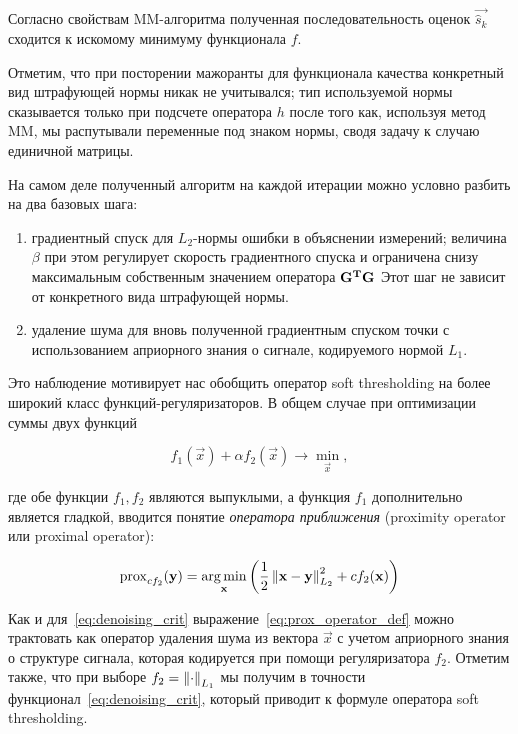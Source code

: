 Согласно свойствам MM-алгоритма полученная последовательность оценок
$\vec{\hat{s}_k}$ сходится к искомому минимуму функционала $f$.

Отметим, что при посторении мажоранты для функционала качества конкретный вид
штрафующей нормы никак не учитывался; тип используемой нормы сказывается только
при подсчете оператора $h$ после того как, используя метод MM, мы распутывали
переменные под знаком нормы, сводя задачу к случаю единичной матрицы.

На самом деле полученный алгоритм на каждой итерации можно условно разбить на два базовых
шага: 

\begin{enumerate}
    \item градиентный спуск для $L_2$-нормы ошибки в объяснении измерений;
        величина $\beta$ при этом регулирует скорость градиентного спуска и ограничена
        снизу максимальным собственным значением оператора $\mathbf{G^TG}$
        Этот шаг не зависит от конкретного вида штрафующей нормы.
    \item удаление шума для вновь полученной градиентным спуском точки с
        использованием априорного знания о сигнале, кодируемого нормой $L_1$.
\end{enumerate}

Это наблюдение мотивирует нас обобщить оператор soft thresholding на
более широкий класс функций-регуляризаторов. В общем случае
при оптимизации суммы двух функций

\begin{equation}
    f_1(\vec{x}) + \alpha f_2(\vec{x}) \rightarrow \underset{\vec{x}}\min,
\end{equation}

где обе функции $f_1, f_2$ являются выпуклыми, а функция $f_1$ дополнительно
является гладкой, вводится понятие \emph{оператора приближения} (proximity
operator или proximal operator):

\begin{equation}
    \operatorname{prox}_{c f_2}(\mathbf{y}) = \operatorname*{arg\,min}_{\mathbf{x}}\left(\frac{1}{2}\left\lVert\mathbf{x - y}\right\rVert^2_{L_2} + c f_2(\mathbf{x})\right)
    \label{eq:prox_operator_def}
\end{equation}

Как и для~\ref{eq:denoising_crit} выражение~\ref{eq:prox_operator_def} можно
трактовать как оператор удаления шума из вектора $\vec{x}$ с учетом априорного
знания о структуре сигнала, которая кодируется при помощи регуляризатора $f_2$.
Отметим также, что при выборе $f_2 = \left\lVert\cdot\right\rVert_{L_1}$ мы получим в точности
функционал~\ref{eq:denoising_crit}, который приводит к формуле оператора
soft thresholding.

